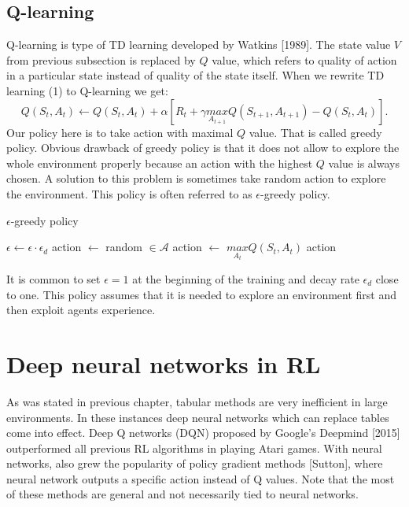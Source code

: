 \subsection{Q-learning}
Q-learning is type of TD learning developed by Watkins [1989]. The state value $V$ from previous subsection is replaced by $Q$ value, which refers to quality of action in a particular state instead of quality of the state itself. When we rewrite TD learning (1) to Q-learning we get:
\begin{equation}
Q(S_t, A_t) \gets Q(S_t, A_t) + \alpha [R_{t} + \gamma \underset{A_{t+1}}{max} Q(S_{t+1}, A_{t+1}) - Q(S_t, A_t)].
\end{equation}
Our policy here is to take action with maximal $Q$ value. That is called greedy policy. Obvious drawback of greedy policy is that it does not allow to explore the whole environment properly because an action with the highest $Q$ value is always chosen. A solution to this problem is sometimes take random action to explore the environment. This policy is often referred to as $\epsilon$-greedy policy.

\begin{algorithm}
\caption{$\epsilon$-greedy policy}\label{euclid}
\begin{algorithmic}[1]
\State $\epsilon \gets \epsilon \cdot \epsilon_d$
\State action $\gets$ random $\in \mathcal{A}$
\Else 
\State action $\gets$ $\underset{A_t}{max} Q(S_t, A_t)$
\EndIf
\State \Return action
\EndProcedure
\end{algorithmic}
\end{algorithm}

It is common to set $\epsilon = 1$ at the beginning of the training and decay rate $\epsilon_d$ close to one. This policy assumes that it is needed to explore an environment first and then exploit agents experience.

\clearpage
\section{Deep neural networks in RL}
As was stated in previous chapter, tabular methods are very inefficient in large environments. In these instances deep neural networks which can replace tables come into effect. Deep Q networks (DQN) proposed by Google’s Deepmind [2015] outperformed all previous RL algorithms in playing Atari games. With neural networks, also grew the popularity of policy gradient methods [Sutton], where neural network outputs a specific action instead of Q values. Note that the most of these methods are general and not necessarily tied to neural networks.

